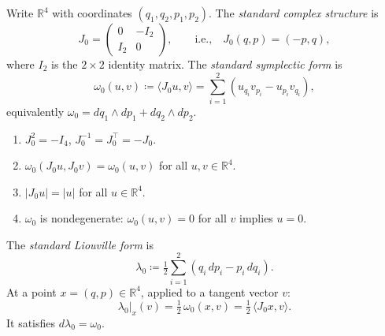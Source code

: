 
\begin{definition}\label{def:symplectic-form}
Write $\mathbb{R}^4$ with coordinates $(q_1, q_2, p_1, p_2)$.
The \emph{standard complex structure} is
\[
  J_0 = \begin{pmatrix} 0 & -I_2 \\ I_2 & 0 \end{pmatrix},
  \qquad\text{i.e.,}\quad
  J_0(q, p) = (-p, q),
\]
where $I_2$ is the $2 \times 2$ identity matrix.
The \emph{standard symplectic form} is
\[
  \omega_0(u, v) \coloneqq \langle J_0 u, v \rangle
  = \sum_{i=1}^{2} (u_{q_i} v_{p_i} - u_{p_i} v_{q_i}),
\]
equivalently $\omega_0 = dq_1 \wedge dp_1 + dq_2 \wedge dp_2$.
\end{definition}

\begin{remark}\label{rem:j0-properties}
\begin{enumerate}
\item $J_0^2 = -I_4$, \quad $J_0^{-1} = J_0^\top = -J_0$.
\item $\omega_0(J_0 u, J_0 v) = \omega_0(u, v)$ for all $u, v \in \mathbb{R}^4$.
\item $|J_0 u| = |u|$ for all $u \in \mathbb{R}^4$.
\item $\omega_0$ is nondegenerate: $\omega_0(u, v) = 0$ for all $v$ implies $u = 0$.
\end{enumerate}
\end{remark}

\begin{definition}\label{def:liouville-form}
The \emph{standard Liouville form} is
\[
  \lambda_0 \coloneqq \tfrac{1}{2} \sum_{i=1}^{2} (q_i \, dp_i - p_i \, dq_i).
\]
At a point $x = (q, p) \in \mathbb{R}^4$, applied to a tangent vector $v$:
\[
  \lambda_0|_x(v) = \tfrac{1}{2}\, \omega_0(x, v) = \tfrac{1}{2}\, \langle J_0 x, v \rangle.
\]
It satisfies $d\lambda_0 = \omega_0$.
\end{definition}



